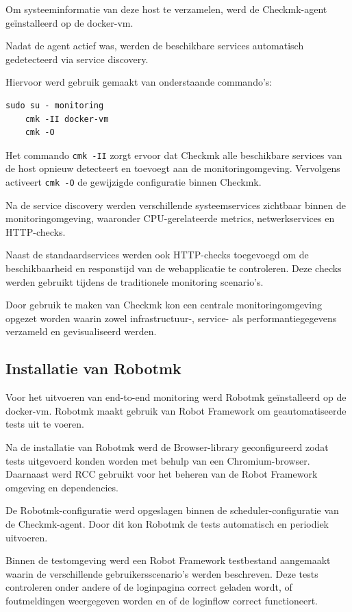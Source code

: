 Om systeeminformatie van deze host te verzamelen, werd de Checkmk-agent geïnstalleerd op de docker-vm.

Nadat de agent actief was, werden de beschikbare services automatisch gedetecteerd via service discovery.

Hiervoor werd gebruik gemaakt van onderstaande commando’s:

\begin{lstlisting}[caption={Service discovery binnen Checkmk}]
    sudo su - monitoring
    cmk -II docker-vm
    cmk -O
\end{lstlisting}

Het commando \texttt{cmk -II} zorgt ervoor dat Checkmk alle beschikbare services van de host opnieuw detecteert en toevoegt aan de monitoringomgeving. Vervolgens activeert \texttt{cmk -O} de gewijzigde configuratie binnen Checkmk.

Na de service discovery werden verschillende systeemservices zichtbaar binnen de monitoringomgeving, waaronder CPU-gerelateerde metrics, netwerkservices en HTTP-checks.

Naast de standaardservices werden ook HTTP-checks toegevoegd om de beschikbaarheid en responstijd van de webapplicatie te controleren. Deze checks werden gebruikt tijdens de traditionele monitoring scenario’s.

Door gebruik te maken van Checkmk kon een centrale monitoringomgeving opgezet worden waarin zowel infrastructuur-, service- als performantiegegevens verzameld en gevisualiseerd werden.



\subsection{Installatie van Robotmk}

Voor het uitvoeren van end-to-end monitoring werd Robotmk geïnstalleerd op de docker-vm. Robotmk maakt gebruik van Robot Framework om geautomatiseerde tests uit te voeren.

Na de installatie van Robotmk werd de Browser-library geconfigureerd zodat tests uitgevoerd konden worden met behulp van een Chromium-browser. Daarnaast werd RCC gebruikt voor het beheren van de Robot Framework omgeving en dependencies.

De Robotmk-configuratie werd opgeslagen binnen de scheduler-configuratie van de Checkmk-agent. Door dit kon Robotmk de tests automatisch en periodiek uitvoeren.

Binnen de testomgeving werd een Robot Framework testbestand aangemaakt waarin de verschillende gebruikersscenario’s werden beschreven. Deze tests controleren onder andere of de loginpagina correct geladen wordt, of foutmeldingen weergegeven worden en of de loginflow correct functioneert.


